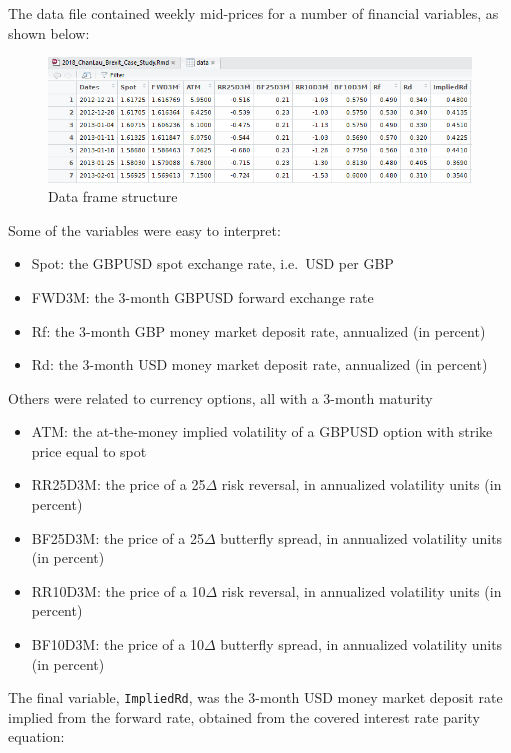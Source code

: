 \documentclass[]{book}
\providecommand{\tightlist}{%
  \setlength{\itemsep}{0pt}\setlength{\parskip}{0pt}}
\theoremstyle{definition}
\theoremstyle{definition}
\theoremstyle{definition}
\theoremstyle{remark}
\begin{document}
The data file contained weekly mid-prices for a number of financial
variables, as shown below:

\begin{figure}
\includegraphics[width=1\linewidth]{images/figDataStructure} \caption{Data frame structure}\label{fig:unnamed-chunk-7}
\end{figure}

Some of the variables were easy to interpret:

\begin{itemize}
\tightlist
\item
  Spot: the GBPUSD spot exchange rate, i.e.~USD per GBP
\item
  FWD3M: the 3-month GBPUSD forward exchange rate
\item
  Rf: the 3-month GBP money market deposit rate, annualized (in percent)
\item
  Rd: the 3-month USD money market deposit rate, annualized (in percent)
\end{itemize}

Others were related to currency options, all with a 3-month maturity

\begin{itemize}
\tightlist
\item
  ATM: the at-the-money implied volatility of a GBPUSD option with
  strike price equal to spot
\item
  RR25D3M: the price of a 25\(\Delta\) risk reversal, in annualized
  volatility units (in percent)
\item
  BF25D3M: the price of a 25\(\Delta\) butterfly spread, in annualized
  volatility units (in percent)
\item
  RR10D3M: the price of a 10\(\Delta\) risk reversal, in annualized
  volatility units (in percent)
\item
  BF10D3M: the price of a 10\(\Delta\) butterfly spread, in annualized
  volatility units (in percent)
\end{itemize}

The final variable, \texttt{ImpliedRd}, was the 3-month USD money market
deposit rate implied from the forward rate, obtained from the covered
interest rate parity equation:
\end{document}
